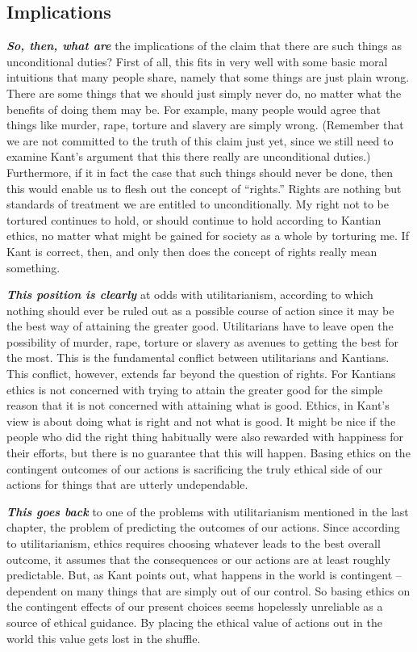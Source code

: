 \documentclass[12pt, openany]{book}
\begin{document}
\hypertarget{implications}{%
\subsection*{Implications}\label{implications}}


\textbf{\emph{So, then, what are}} the implications of the claim that there are such things as unconditional duties? First of all, this fits in very well with some basic moral intuitions that many people share, namely that some things are just plain wrong. There are some things that we should just simply never do, no matter what the benefits of doing them may be. For example, many people would agree that things like murder, rape, torture and slavery are simply wrong. (Remember that we are not committed to the truth of this claim just yet, since we still need to examine Kant's argument that this there really are unconditional duties.) Furthermore, if it in fact the case that such things should never be done, then this would enable us to flesh out the concept of ``rights.'' Rights are nothing but standards of treatment we are entitled to unconditionally. My right not to be tortured continues to hold, or should continue to hold according to Kantian ethics, no matter what might be gained for society as a whole by torturing me. If Kant is correct, then, and only then does the concept of rights really mean something.

\textbf{\emph{This position is clearly}} at odds with utilitarianism, according to which nothing should ever be ruled out as a possible course of action since it may be the best way of attaining the greater good. Utilitarians have to leave open the possibility of murder, rape, torture or slavery as avenues to getting the best for the most. This is the fundamental conflict between utilitarians and Kantians. This conflict, however, extends far beyond the question of rights. For Kantians ethics is not concerned with trying to attain the greater good for the simple reason that it is not concerned with attaining what is good. Ethics, in Kant's view is about doing what is right and not what is good. It might be nice if the people who did the right thing habitually were also rewarded with happiness for their efforts, but there is no guarantee that this will happen. Basing ethics on the contingent outcomes of our actions is sacrificing the truly ethical side of our actions for things that are utterly undependable.

\textbf{\emph{This goes back}} to one of the problems with utilitarianism mentioned in the last chapter, the problem of predicting the outcomes of our actions. Since according to utilitarianism, ethics requires choosing whatever leads to the best overall outcome, it assumes that the consequences or our actions are at least roughly predictable. But, as Kant points out, what happens in the world is contingent -- dependent on many things that are simply out of our control. So basing ethics on the contingent effects of our present choices seems hopelessly unreliable as a source of ethical guidance. By placing the ethical value of actions out in the world this value gets lost in the shuffle.
\end{document}
